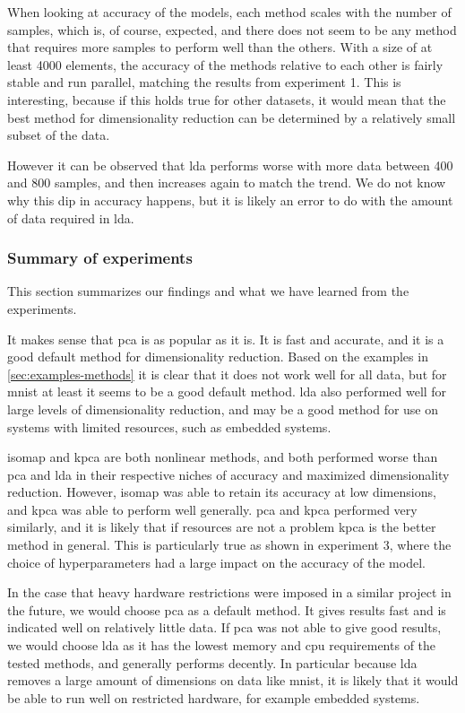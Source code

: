 When looking at accuracy of the models, each method scales with the number of samples, which is, of course, expected, and there does not seem to be any method that requires more samples to perform well than the others. With a size of at least 4000 elements, the accuracy of the methods relative to each other is fairly stable and run parallel, matching the results from experiment 1. This is interesting, because if this holds true for other datasets, it would mean that the best method for dimensionality reduction can be determined by a relatively small subset of the data.

However it can be observed that \gls{lda} performs worse with more data between 400 and 800 samples, and then increases again to match the trend. We do not know why this dip in accuracy happens, but it is likely an error to do with the amount of data required in \gls{lda}.


\subsubsection{Summary of experiments}\label{subsec:summary-of-experiments}
This section summarizes our findings and what we have learned from the experiments.

It makes sense that \gls{pca} is as popular as it is. It is fast and accurate, and it is a good default method for dimensionality reduction. Based on the examples in \autoref{sec:examples-methods} it is clear that it does not work well for all data, but for \gls{mnist} at least it seems to be a good default method. \gls{lda} also performed well for large levels of dimensionality reduction, and may be a good method for use on systems with limited resources, such as embedded systems.

\gls{isomap} and \gls{kpca} are both nonlinear methods, and both performed worse than \gls{pca} and \gls{lda} in their respective niches of accuracy and maximized dimensionality reduction. However, \gls{isomap} was able to retain its accuracy at low dimensions, and \gls{kpca} was able to perform well generally. \gls{pca} and \gls{kpca} performed very similarly, and it is likely that if resources are not a problem \gls{kpca} is the better method in general. This is particularly true as shown in experiment 3, where the choice of hyperparameters had a large impact on the accuracy of the model.

In the case that heavy hardware restrictions were imposed in a similar project in the future, we would choose \gls{pca} as a default method. It gives results fast and is indicated well on relatively little data. If \gls{pca} was not able to give good results, we would choose \gls{lda} as it has the lowest memory and \gls{cpu} requirements of the tested methods, and generally performs decently. In particular because \gls{lda} removes a large amount of dimensions on data like \gls{mnist}, it is likely that it would be able to run well on restricted hardware, for example embedded systems.

